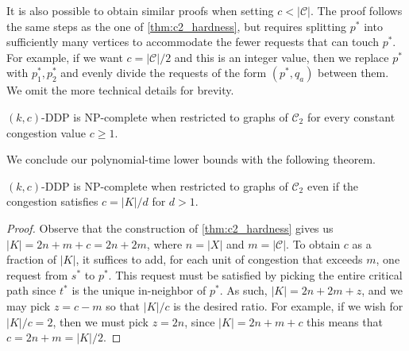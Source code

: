 \documentclass[a4paper,UKenglish,cleveref, autoref, thm-restate]{lipics-v2021}
\renewcommand{\NP}{{\sf NP}\xspace}
\newcommand{\pname}[1]{{\sc #1}}
\newcommand{\congestion}{c}
\begin{document}
It is also possible to obtain similar proofs when setting $\congestion < |\mathcal{C}|$.
The proof follows the same steps as the one of \autoref{thm:c2_hardness}, but
requires splitting $p^*$ into sufficiently many vertices to accommodate the fewer
requests that can touch $p^*$. For example, if we want $\congestion = |\mathcal{C}|/2$
and this is an integer value, then we replace $p^*$ with $p^*_1, p^*_2$ and evenly divide
the requests of the form $(p^*, q_a)$ between them. We omit the more technical details for brevity.

\begin{theorem}
  \label{thm:c2_hardness_cte_ratio}
  \pname{$(k,c)$-DDP} is \NP-complete when restricted to graphs of
  $\mathcal{C}_2$ for every constant congestion value $\congestion \geq 1$.
\end{theorem}

We conclude our polynomial-time lower bounds with the following theorem.

\begin{theorem}
  \label{thm:c2_hardness_all_ratio}
  \pname{$(k,c)$-DDP} is \NP-complete when restricted to graphs of
  $\mathcal{C}_2$ even if the congestion satisfies $\congestion = |K|/d$ for $d > 1$.
\end{theorem}

\begin{proof}
  Observe that the construction of \autoref{thm:c2_hardness} gives us $|K| = 2n + m +
  \congestion = 2n + 2m$, where $n = |X|$ and $m = |\mathcal{C}|$. To obtain
  $\congestion$ as a fraction of $|K|$, it suffices to add, for each unit of congestion
  that exceeds $m$, one request
  from $s^*$ to $p^*$. This request must be satisfied by picking the entire critical path
  since $t^*$ is the unique in-neighbor of $p^*$.
  As such, $|K| = 2n + 2m + z$, and we may pick $z = \congestion - m$ so that $|K|/\congestion$ is
  the desired ratio. For example, if we wish for $|K|/\congestion = 2$, then we must pick
  $z = 2n$, since $|K| = 2n + m + \congestion$ this means that $\congestion = 2n + m = |K|/2$.
\end{proof}
\end{document}
